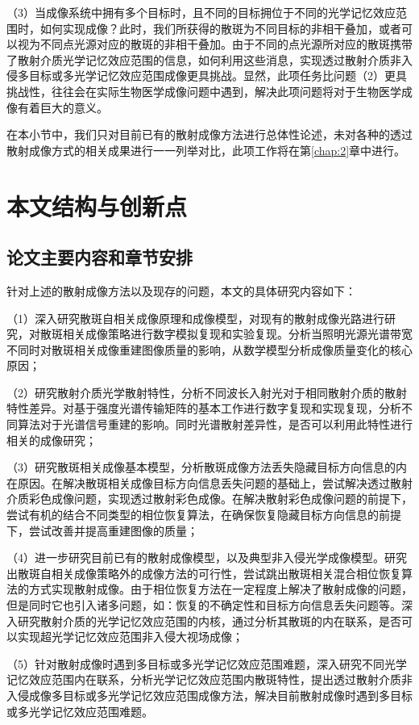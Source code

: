 （3）当成像系统中拥有多个目标时，且不同的目标拥位于不同的光学记忆效应范围时，如何实现成像？此时，我们所获得的散斑为不同目标的非相干叠加，或者可以视为不同点光源对应的散斑的非相干叠加。由于不同的点光源所对应的散斑携带了散射介质光学记忆效应范围的信息，如何利用这些消息，实现透过散射介质非入侵多目标或多光学记忆效应范围成像更具挑战。显然，此项任务比问题（2）更具挑战性，往往会在实际生物医学成像问题中遇到，解决此项问题将对于生物医学成像有着巨大的意义。

在本小节中，我们只对目前已有的散射成像方法进行总体性论述，未对各种的透过散射成像方式的相关成果进行一一列举对比，此项工作将在第\ref{chap:2}章中进行。

\section{本文结构与创新点}

\subsection{论文主要内容和章节安排}
针对上述的散射成像方法以及现存的问题，本文的具体研究内容如下：

（1）深入研究散斑自相关成像原理和成像模型，对现有的散射成像光路进行研究，对散斑相关成像策略进行数字模拟复现和实验复现。分析当照明光源光谱带宽不同时对散斑相关成像重建图像质量的影响，从数学模型分析成像质量变化的核心原因；

（2）研究散射介质光学散射特性，分析不同波长入射光对于相同散射介质的散射特性差异。对基于强度光谱传输矩阵的基本工作进行数字复现和实现复现，分析不同算法对于光谱信号重建的影响。同时光谱散射差异性，是否可以利用此特性进行相关的成像研究；

（3）研究散斑相关成像基本模型，分析散斑成像方法丢失隐藏目标方向信息的内在原因。在解决散斑相关成像目标方向信息丢失问题的基础上，尝试解决透过散射介质彩色成像问题，实现透过散射彩色成像。在解决散射彩色成像问题的前提下，尝试有机的结合不同类型的相位恢复算法，在确保恢复隐藏目标方向信息的前提下，尝试改善并提高重建图像的质量；

（4）进一步研究目前已有的散射成像模型，以及典型非入侵光学成像模型。研究出散斑自相关成像策略外的成像方法的可行性，尝试跳出散斑相关混合相位恢复算法的方式实现散射成像。由于相位恢复方法在一定程度上解决了散射成像的问题，但是同时它也引入诸多问题，如：恢复的不确定性和目标方向信息丢失问题等。深入研究散射介质的光学记忆效应范围的内核，通过分析其散斑的内在联系，是否可以实现超光学记忆效应范围非入侵大视场成像；

（5）针对散射成像时遇到多目标或多光学记忆效应范围难题，深入研究不同光学记忆效应范围内在联系，分析光学记忆效应范围内散斑特性，提出透过散射介质非入侵成像多目标或多光学记忆效应范围成像方法，解决目前散射成像时遇到多目标或多光学记忆效应范围难题。

